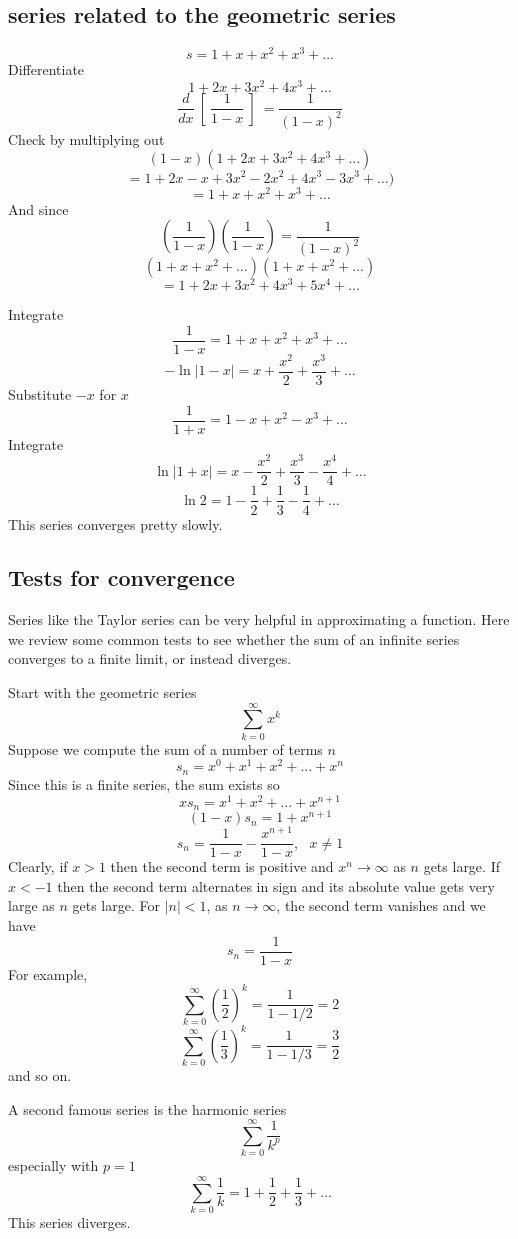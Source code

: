 \documentclass[11pt, oneside]{article}   	%
\begin{document}
\subsection*{series related to the geometric series}
\[ s = 1 + x + x^2 + x^3 + \dots \]
Differentiate
\[ 1 + 2x + 3x^2 + 4x^3 + \dots \]
\[ \frac{d}{dx} \ [ \ \frac{1}{1-x} \ ] \ = \frac{1}{(1-x)^2} \]
Check by multiplying out
\[ (1-x) (1 + 2x + 3x^2 + 4x^3 + \dots ) \]
\[ = 1 + 2x - x + 3x^2 - 2x^2 + 4x^3 - 3x^3 +  \dots ) \]
\[ = 1 + x + x^2 + x^3 + \dots \]
And since
\[ (\frac{1}{1-x})(\frac{1}{1-x}) = \frac{1}{(1-x)^2} \]
\[ (1 + x + x^2 + \dots) (1 + x + x^2 + \dots) \]
\[ = 1 + 2x + 3x^2 + 4x^3 + 5x^4 + \dots \]

Integrate
\[ \frac{1}{1-x} = 1 + x + x^2 + x^3 + \dots \]
\[ -\ln |1-x| = x + \frac{x^2}{2} + \frac{x^3}{3} + \dots \]
Substitute $-x$ for $x$
\[ \frac{1}{1+x} = 1 - x + x^2 - x^3 + \dots \]
Integrate
\[ \ln |1+x| = x - \frac{x^2}{2} + \frac{x^3}{3} - \frac{x^4}{4} + \dots \]
\[ \ln 2 = 1 - \frac{1}{2} + \frac{1}{3} - \frac{1}{4} + \dots \]
This series converges pretty slowly.

\subsection*{Tests for convergence}
Series like the Taylor series can be very helpful in approximating a function.  Here we review some common tests to see whether the sum of an infinite series converges to a finite limit, or instead diverges.

Start with the geometric series
\[ \sum_{k=0}^{\infty} x^k \]
Suppose we compute the sum of a number of terms $n$
\[ s_n = x^0 + x^1 + x^2 + \dots + x^n \]
Since this is a finite series, the sum exists so
\[ x s_n = x^1 + x^2 + \dots + x^{n+1} \]
\[ (1-x) s_n = 1 + x^{n+1} \]
\[ s_n = \frac{1}{1-x} - \frac{x^{n+1}}{1-x}, \ \ \ x \ne 1 \]
Clearly, if $x>1$ then the second term is positive and $x^n \rightarrow \infty$ as $n$ gets large.  If $x<-1$ then the second term alternates in sign and its absolute value gets very large as $n$ gets large.  For $|n| < 1$, as $n \rightarrow \infty$, the second term vanishes and we have
\[ s_n = \frac{1}{1-x} \]
For example,
\[ \sum_{k=0}^{\infty} (\frac{1}{2})^k = \frac{1}{1-1/2} = 2 \]
\[ \sum_{k=0}^{\infty} (\frac{1}{3})^k = \frac{1}{1-1/3} = \frac{3}{2} \]
and so on.

A second famous series is the harmonic series
\[ \sum_{k=0}^{\infty} \frac{1}{k^p} \]
especially with $p=1$
\[ \sum_{k=0}^{\infty} \frac{1}{k} = 1 + \frac{1}{2} + \frac{1}{3} + \dots \]
This series diverges.  
\end{document}
